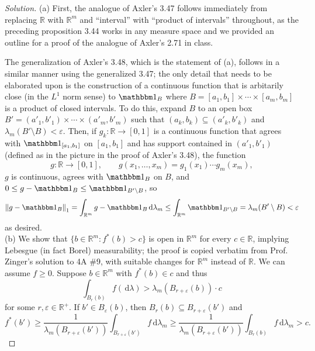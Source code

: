 \documentclass[10pt]{article}
\newcommand{\dd}{\,\mathrm{d}}
\providecommand{\eps}{\varepsilon}
\providecommand{\RR}{\mathbb R}
\providecommand{\ind}{\mathbbm 1}
\newenvironment{soln}{\begin{proof}[Solution]}{\end{proof}}
\providecommand{\norm}[1]{\left\| #1\right\|}
\begin{document}
\begin{soln}
    (a) First, the analogue of Axler's 3.47
    follows immediately from replacing $\RR$ with $\RR^m$
    and ``interval'' with ``product of intervals'' throughout,
    as the preceding proposition 3.44 works in any measure space
    and we provided an outline for a proof of
    the analogue of Axler's 2.71 in class.

    The generalization of Axler's 3.48, which is the statement of (a),
    follows in a similar manner using the generalized 3.47;
    the only detail that needs to be elaborated upon is the construction of
    a continuous function that is arbitarily close (in the $L^1$ norm sense)
    to $\ind_{B}$ where $B = [a_1,b_1]\times\cdots\times[a_m,b_m]$
    is a product of closed intervals. To do this,
    expand $B$ to an open box $B' = (a'_1, b'_1)\times\cdots\times(a'_m,b'_m)$
    such that $(a_k,b_k)\subseteq(a'_k,b'_k)$ and $\lambda_m(B'\setminus B) < \eps$.
    Then, if $g_k\colon\RR\to[0,1]$ is a continuous function
    that agrees with $\ind_{[a_1,b_1]}$ on $[a_1,b_1]$
    and has support contained in $(a'_1,b'_1)$
    (defined as in the picture in the proof of Axler's 3.48), the function
    \begin{equation*}
	g\colon\RR\to[0,1],\qquad g(x_1,\dots,x_m) = g_1(x_1)\cdots g_m(x_m),
    \end{equation*}
    $g$ is continuous, agrees with $\ind_B$ on $B$,
    and $0\le g - \ind_B \le \ind_{B'\setminus B}$, so
    \begin{equation*}
	\norm{g - \ind_B}_1 = \int_{\RR^m} g- \ind_B\dd\lambda_m
	\le \int_{\RR^m}\ind_{B'\setminus B} = \lambda_m(B'\setminus B) < \eps
    \end{equation*}
    as desired.
    \\

    (b)  We show that $\{b\in\RR^m : f^*(b) > c\}$ is open in $\RR^m$
    for every $c\in\RR$, implying Lebesgue (in fact Borel) measurability;
    the proof is copied verbatim from Prof. Zinger's solution to 4A \#9,
    with suitable changes for $\RR^m$ instead of $\RR$.
    We can assume $f\ge 0$. Suppose $b\in\RR^m$ with $f^*(b)\in c$ and thus
    \begin{equation*}
	\int_{B_r(b)} f(\dd\lambda) > \lambda_m(B_{r+\eps}(b))\cdot c
    \end{equation*}
    for some $r,\eps\in\RR^+$. If $b'\in B_\eps(b)$, then
    $B_r(b) \subseteq B_{r+\eps}(b')$ and
    \begin{equation*}
	f^*(b') \ge \frac1{\lambda_m(B_{r+\eps}(b'))}
	\int_{B_{r+\eps}(b')}f\dd\lambda_m
	\ge \frac 1{\lambda_m(B_{r+\eps}(b'))}\int_{B_r(b)} f\dd\lambda_m > c.
    \end{equation*}


\end{soln}
\end{document}
